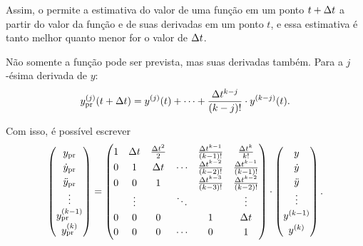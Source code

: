 Assim, o  permite a estimativa do valor de uma função em um ponto \(t+\Delta t\) a partir do valor da função e de suas derivadas em um ponto \(t\), e essa estimativa é tanto melhor quanto menor for o valor de \(\Delta t\).

Não somente a função pode ser prevista, mas suas derivadas também. Para a \(j\)-ésima derivada de \(y\):
\begin{equation*}
	\predicted{\deriv{j}{y}}\pqty{t + \Dt} = \deriv{j}{y}\pqty{t} + \dots + \dfrac{\Dt^{\taylorOrder-j}}{\pqty{\taylorOrder-j}!}\cdot\deriv{\taylorOrder-j}{y}\pqty{t}.
\end{equation*}

Com isso, é possível escrever
\begin{equation} \label{eq:extrapolation_matricial_form}
	\def\arraystretch{1.2}
\begin{pmatrix}
	\predicted{y} \\
	\predicted{\deriv{1}{y}} \\
	\predicted{\deriv{2}{y}} \\
	\vdots \\
	\predicted{\deriv{\taylorOrder-1}{y}} \\
	\predicted{\deriv{\taylorOrder}{y}}
\end{pmatrix}
=
\begin{pmatrix}
	1 & \Dt & \frac{\Dt^2}{2} &  & \frac{\Dt^{\taylorOrder-1}}{\pqty{\taylorOrder-1}!} & \frac{\Dt^\taylorOrder}{\taylorOrder!} \\
	0 & 1 & \Dt & \cdots & \frac{\Dt^{\taylorOrder-2}}{\pqty{\taylorOrder-2}!} & \frac{\Dt^{\taylorOrder-1}}{\pqty{\taylorOrder-1}!} \\
	0 & 0 & 1 &  & \frac{\Dt^{\taylorOrder-3}}{\pqty{\taylorOrder-3}!} & \frac{\Dt^{\taylorOrder-2}}{\pqty{\taylorOrder-2}!} \\
     & \vdots & & \ddots & & \vdots \\
    0 & 0 & 0 &  & 1 & \Dt \\
    0 & 0 & 0 & \cdots & 0 & 1
\end{pmatrix}
\cdot
\begin{pmatrix}
	y \\
	\deriv{1}{y} \\
	\deriv{2}{y} \\
	\vdots \\
	\deriv{\taylorOrder-1}{y} \\
	\deriv{\taylorOrder}{y}
\end{pmatrix}.
\end{equation}

